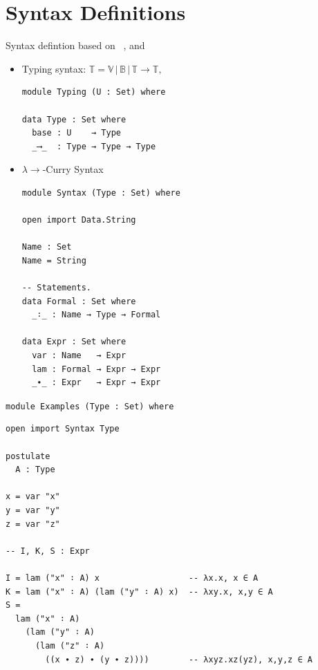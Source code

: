 \documentclass[10pt, xetex, hyperref={pdfpagelabels=false}]{beamer}
\begin{document}
\section{Syntax Definitions}
\begin{frame}[fragile]{Syntax defintion based on ~\citep{cactus}, and \citep{nad}}
\begin{itemize}
  \item Typing syntax: $𝕋 = 𝕍\, |\, 𝔹\, |\, 𝕋 → 𝕋,$
  \pause
  \vskip 1.5mm
\begin{verbatim}
module Typing (U : Set) where

data Type : Set where
  base : U    → Type
  _⟶_  : Type → Type → Type
\end{verbatim}
\pause
\item $\lambda\rightarrow$-Curry Syntax
\vskip 1.5mm
\begin{verbatim}
module Syntax (Type : Set) where

open import Data.String

Name : Set
Name = String

-- Statements.
data Formal : Set where
  _∶_ : Name → Type → Formal

data Expr : Set where
  var : Name   → Expr
  lam : Formal → Expr → Expr
  _∙_ : Expr   → Expr → Expr
\end{verbatim}
\end{itemize}
\end{frame}

\begin{frame}[fragile]{\texttt{module Examples (Type : Set) where}}
\begin{verbatim}
open import Syntax Type

postulate
  A : Type

x = var "x"
y = var "y"
z = var "z"

-- I, K, S : Expr

I = lam ("x" ∶ A) x                  -- λx.x, x ∈ A
K = lam ("x" ∶ A) (lam ("y" ∶ A) x)  -- λxy.x, x,y ∈ A
S =
  lam ("x" ∶ A)
    (lam ("y" ∶ A)
      (lam ("z" ∶ A)
        ((x ∙ z) ∙ (y ∙ z))))        -- λxyz.xz(yz), x,y,z ∈ A
\end{verbatim}
\end{frame}
\end{document}

